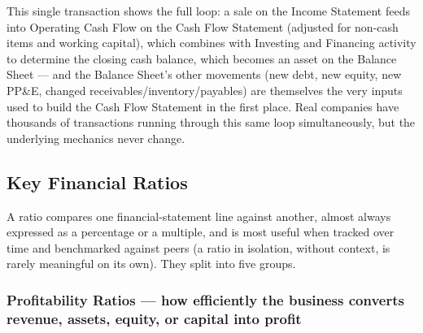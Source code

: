 \documentclass[12pt,openany]{book}
\begin{document}
This single transaction shows the full loop: a sale on the Income Statement feeds into Operating Cash Flow on the Cash Flow Statement (adjusted for non-cash items and working capital), which combines with Investing and Financing activity to determine the closing cash balance, which becomes an asset on the Balance Sheet --- and the Balance Sheet's other movements (new debt, new equity, new PP\&E, changed receivables/inventory/payables) are themselves the very inputs used to build the Cash Flow Statement in the first place. Real companies have thousands of transactions running through this same loop simultaneously, but the underlying mechanics never change.

\subsection{Key Financial Ratios}

A ratio compares one financial-statement line against another, almost always expressed as a percentage or a multiple, and is most useful when tracked over time and benchmarked against peers (a ratio in isolation, without context, is rarely meaningful on its own). They split into five groups.

\subsubsection{Profitability Ratios --- how efficiently the business converts revenue, assets, equity, or capital into profit}
\end{document}
